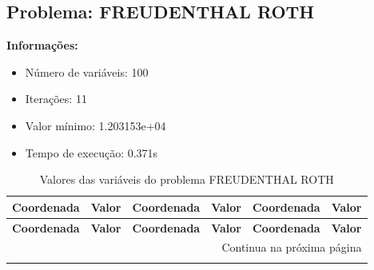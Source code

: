 \documentclass[12pt]{article}
\begin{document}
\newpage            
\subsection{Problema: FREUDENTHAL ROTH}

\textbf{Informações:}
\begin{itemize}
\item Número de variáveis: 100
\item Iterações: 11
\item Valor mínimo: 1.203153e+04
\item Tempo de execução: 0.371s
\end{itemize}

\small
\begin{longtable}{@{}cc|cc|cc@{}}
\caption{Valores das variáveis do problema FREUDENTHAL ROTH} \\
\toprule
\textbf{Coordenada} & \textbf{Valor} & \textbf{Coordenada} & \textbf{Valor} & \textbf{Coordenada} & \textbf{Valor} \\
\midrule
\endfirsthead

\toprule
\textbf{Coordenada} & \textbf{Valor} & \textbf{Coordenada} & \textbf{Valor} & \textbf{Coordenada} & \textbf{Valor} \\
\midrule
\endhead

\midrule \multicolumn{6}{r}{{Continua na próxima página}} \\ \midrule
\endfoot


\end{longtable}
\end{document}
